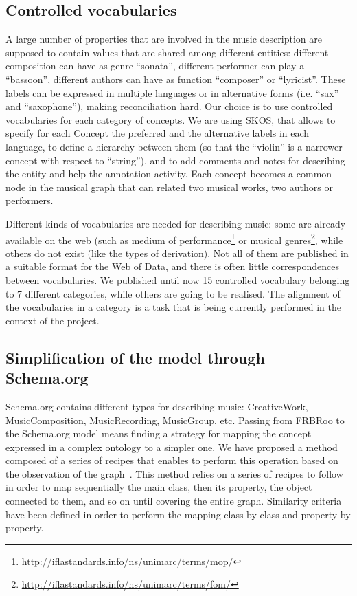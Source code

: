 \documentclass[a4paper,11pt]{report}
\begin{document}
\subsection{Controlled vocabularies}
A large number of properties that are involved in the music description are supposed to contain values that are shared among different entities: different composition can have as genre ``sonata'', different performer can play a ``bassoon'', different authors can have as function ``composer'' or ``lyricist''. These labels can be expressed in multiple languages or in alternative forms (i.e. ``sax'' and ``saxophone''), making reconciliation hard. Our choice is to use controlled vocabularies for each category of concepts. We are using SKOS, that allows to specify for each Concept the preferred and the alternative labels in each language, to define a hierarchy between them (so that the ``violin'' is a narrower concept with respect to ``string''), and to add comments and notes for describing the entity and help the annotation activity. Each concept becomes a common node in the musical graph that can related two musical works, two authors or performers.

Different kinds of vocabularies are needed for describing music: some are already available on the web (such as medium of performance\footnote{\url{http://iflastandards.info/ns/unimarc/terms/mop/}} or musical genres\footnote{\url{http://iflastandards.info/ns/unimarc/terms/fom/}}, while others do not exist (like the types of derivation). Not all of them are published in a suitable format for the Web of Data, and there is often little correspondences between vocabularies. We published until now 15 controlled vocabulary belonging to 7 different categories, while others are going to be realised. The alignment of the vocabularies in a category is a task that is being currently performed in the context of the project.

\subsection{Simplification of the model through Schema.org} \label{schemaOrg}

Schema.org contains different types for describing music: CreativeWork, MusicComposition, MusicRecording, MusicGroup, etc. Passing from FRBRoo to the Schema.org model means finding a strategy for mapping the concept expressed in a complex ontology to a simpler one. We have proposed a method composed of a series of recipes that enables to perform this operation based on the observation of the graph~\cite{lisena2016mapping}. This method relies on a series of recipes to follow in order to map sequentially the main class, then its property, the object connected to them, and so on until covering the entire graph. Similarity criteria have been defined in order to perform the mapping class by class and property by property.
\end{document}
